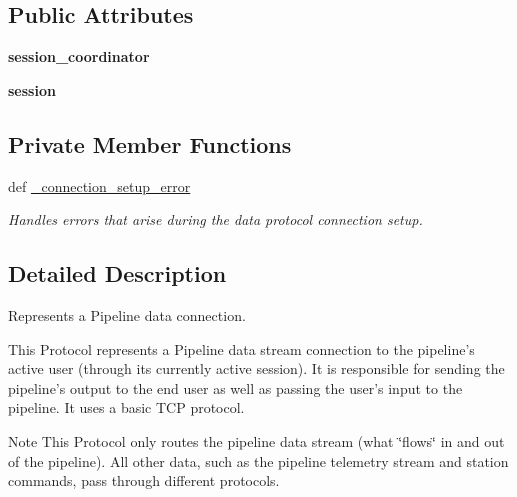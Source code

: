 \subsection*{Public Attributes}
\begin{DoxyCompactItemize}
\item 
\hypertarget{classhwm_1_1network_1_1protocols_1_1data_1_1_pipeline_data_a742b0f71b186c65aa5cd4e5b5aec2012}{{\bfseries session\-\_\-coordinator}}\label{classhwm_1_1network_1_1protocols_1_1data_1_1_pipeline_data_a742b0f71b186c65aa5cd4e5b5aec2012}

\item 
\hypertarget{classhwm_1_1network_1_1protocols_1_1data_1_1_pipeline_data_a1482b4c38b299e99db4d11fab87e8ff9}{{\bfseries session}}\label{classhwm_1_1network_1_1protocols_1_1data_1_1_pipeline_data_a1482b4c38b299e99db4d11fab87e8ff9}

\end{DoxyCompactItemize}
\subsection*{Private Member Functions}
\begin{DoxyCompactItemize}
\item 
def \hyperlink{classhwm_1_1network_1_1protocols_1_1data_1_1_pipeline_data_ad7c04014de21311a3073d6859c417038}{\-\_\-connection\-\_\-setup\-\_\-error}
\begin{DoxyCompactList}\small\item\em Handles errors that arise during the data protocol connection setup. \end{DoxyCompactList}\end{DoxyCompactItemize}


\subsection{Detailed Description}
Represents a Pipeline data connection. 

This Protocol represents a Pipeline data stream connection to the pipeline's active user (through its currently active session). It is responsible for sending the pipeline's output to the end user as well as passing the user's input to the pipeline. It uses a basic T\-C\-P protocol.

\begin{DoxyNote}{Note}
This Protocol only routes the pipeline data stream (what \char`\"{}flows\char`\"{} in and out of the pipeline). All other data, such as the pipeline telemetry stream and station commands, pass through different protocols. 
\end{DoxyNote}


